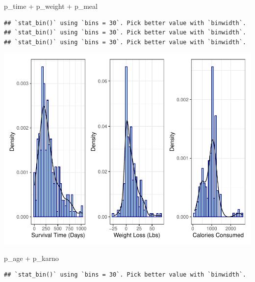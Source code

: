 \documentclass[
]{article}
\newenvironment{Shaded}{\begin{snugshade}}{\end{snugshade}}
\newcommand{\NormalTok}[1]{#1}
\newcommand{\SpecialCharTok}[1]{\textcolor[rgb]{0.00,0.00,0.00}{#1}}
\begin{document}
\begin{Shaded}
\begin{Highlighting}[]
\NormalTok{p\_time }\SpecialCharTok{+}\NormalTok{ p\_weight }\SpecialCharTok{+}\NormalTok{ p\_meal}
\end{Highlighting}
\end{Shaded}

\begin{verbatim}
## `stat_bin()` using `bins = 30`. Pick better value with `binwidth`.
## `stat_bin()` using `bins = 30`. Pick better value with `binwidth`.
## `stat_bin()` using `bins = 30`. Pick better value with `binwidth`.
\end{verbatim}

\includegraphics{final_project_files/figure-latex/unnamed-chunk-6-2.pdf}

\begin{Shaded}
\begin{Highlighting}[]
\NormalTok{p\_age }\SpecialCharTok{+}\NormalTok{ p\_karno}
\end{Highlighting}
\end{Shaded}

\begin{verbatim}
## `stat_bin()` using `bins = 30`. Pick better value with `binwidth`.
\end{verbatim}
\end{document}
